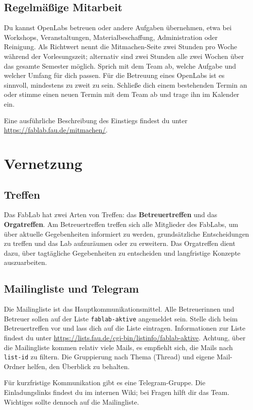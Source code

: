\documentclass{\basedir/fablab-document}
\begin{document}
\subsection{Regelmäßige Mitarbeit}
Du kannst OpenLabs betreuen oder andere Aufgaben übernehmen, etwa bei Workshops,
Veranstaltungen, Materialbeschaffung, Administration oder Reinigung.
Als Richtwert nennt die Mitmachen-Seite zwei Stunden pro Woche während der Vorlesungszeit;
alternativ sind zwei Stunden alle zwei Wochen über das gesamte Semester möglich.
Sprich mit dem Team ab, welche Aufgabe und welcher Umfang für dich passen.
Für die Betreuung eines OpenLabs ist es sinnvoll, mindestens zu zweit zu sein.
Schließe dich einem bestehenden Termin an oder stimme einen neuen Termin mit dem Team ab
und trage ihn im Kalender ein.

Eine ausführliche Beschreibung des Einstiegs findest du unter \url{https://fablab.fau.de/mitmachen/}.

\section{Vernetzung}
\subsection{Treffen}
Das FabLab hat zwei Arten von Treffen: das \textbf{Betreuertreffen} und das \textbf{Orgatreffen}.
Am Betreuertreffen treffen sich alle Mitglieder des FabLabs, um über aktuelle Gegebenheiten informiert zu werden,
grundsätzliche Entscheidungen zu treffen und das Lab aufzuräumen oder zu erweitern.
Das Orgatreffen dient dazu, über tagtägliche Gegebenheiten zu entscheiden und langfristige Konzepte auszuarbeiten.

\subsection{Mailingliste und Telegram}
Die Mailingliste ist das Hauptkommunikationsmittel.
Alle Betreuerinnen und Betreuer sollen auf der Liste \texttt{fablab-aktive} angemeldet sein.
Stelle dich beim Betreuertreffen vor und lass dich auf die Liste eintragen.
Informationen zur Liste findest du unter \url{https://lists.fau.de/cgi-bin/listinfo/fablab-aktive}.
Achtung, über die Mailingliste kommen relativ viele Mails, es empfiehlt sich, die Mails nach \texttt{list-id} zu filtern.
Die Gruppierung nach Thema (Thread) und eigene Mail-Ordner helfen, den Überblick zu behalten.

Für kurzfristige Kommunikation gibt es eine Telegram-Gruppe.
Die Einladungslinks findest du im internen Wiki; bei Fragen hilft dir das Team.
Wichtiges sollte dennoch auf die Mailingliste.
\end{document}
